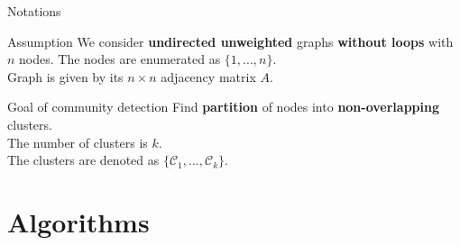 \documentclass{beamer}
\theoremstyle{definition}
\theoremstyle{plain}
\theoremstyle{remark}
\begin{document}
			\begin{frame}{Notations}

			\begin{block}{Assumption}
				We consider \textbf{undirected unweighted} graphs \textbf{without loops} with $n$ nodes.
				The nodes are enumerated as $\{ 1, ..., n\}$.\\
				Graph is given by its $n \times n $ adjacency matrix $A$.

			\end{block}

			\begin{block}{Goal of community detection}
				Find \textbf{partition} of nodes into \textbf{non-overlapping} clusters.\\
				The number of clusters is $k$.\\
				The clusters are denoted as $\{ \mathcal{C}_1, ..., \mathcal{C}_k\}$.
			\end{block}
		\end{frame}

	\section{Algorithms}
\end{document}
